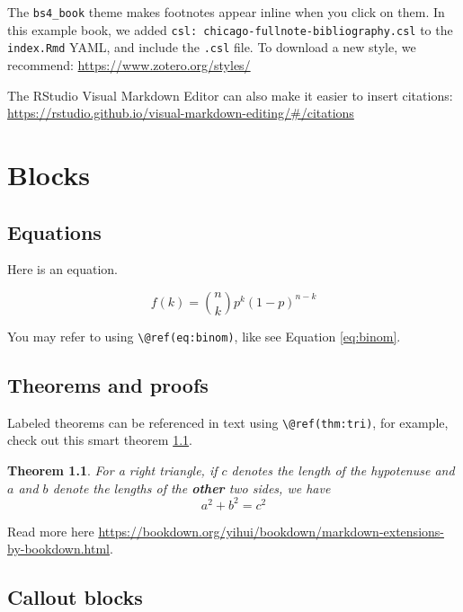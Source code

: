 \documentclass[
]{book}
\newtheorem{theorem}{Theorem}[chapter]
\theoremstyle{definition}
\theoremstyle{definition}
\theoremstyle{definition}
\theoremstyle{definition}
\theoremstyle{remark}
\begin{document}
The \texttt{bs4\_book} theme makes footnotes appear inline when you click on them. In this example book, we added \texttt{csl:\ chicago-fullnote-bibliography.csl} to the \texttt{index.Rmd} YAML, and include the \texttt{.csl} file. To download a new style, we recommend: \url{https://www.zotero.org/styles/}

The RStudio Visual Markdown Editor can also make it easier to insert citations: \url{https://rstudio.github.io/visual-markdown-editing/\#/citations}

\hypertarget{blocks}{%
\chapter{Blocks}\label{blocks}}

\hypertarget{equations}{%
\section{Equations}\label{equations}}

Here is an equation.

\begin{equation} 
  f\left(k\right) = \binom{n}{k} p^k\left(1-p\right)^{n-k}
  \label{eq:binom}
\end{equation}

You may refer to using \texttt{\textbackslash{}@ref(eq:binom)}, like see Equation \eqref{eq:binom}.

\hypertarget{theorems-and-proofs}{%
\section{Theorems and proofs}\label{theorems-and-proofs}}

Labeled theorems can be referenced in text using \texttt{\textbackslash{}@ref(thm:tri)}, for example, check out this smart theorem \ref{thm:tri}.

\begin{theorem}
\protect\hypertarget{thm:tri}{}\label{thm:tri}For a right triangle, if \(c\) denotes the \emph{length} of the hypotenuse
and \(a\) and \(b\) denote the lengths of the \textbf{other} two sides, we have
\[a^2 + b^2 = c^2\]
\end{theorem}

Read more here \url{https://bookdown.org/yihui/bookdown/markdown-extensions-by-bookdown.html}.

\hypertarget{callout-blocks}{%
\section{Callout blocks}\label{callout-blocks}}
\end{document}
